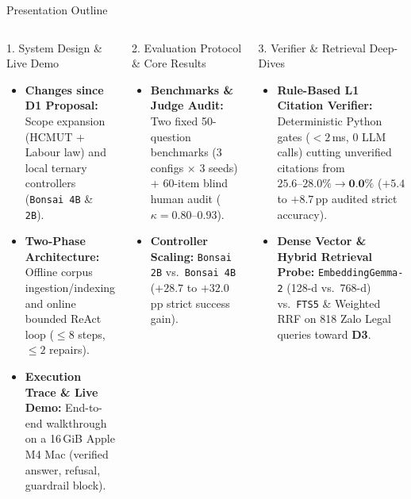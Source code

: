 \documentclass[aspectratio=1610,11pt]{beamer}
\newcommand{\pp}{\,pp\xspace}
\begin{document}
\begin{frame}{Presentation Outline}
  \begin{columns}[T]
    \begin{block}{1. System Design \& Live Demo}
      \scriptsize
      \begin{itemize}\scriptsize
        \item \textbf{Changes since D1 Proposal:} Scope expansion (HCMUT + Labour law) and local ternary controllers (\texttt{Bonsai 4B} \& \texttt{2B}).
        \item \textbf{Two-Phase Architecture:} Offline corpus ingestion/indexing and online bounded ReAct loop ($\le 8$ steps, $\le 2$ repairs).
        \item \textbf{Execution Trace \& Live Demo:} End-to-end walkthrough on a 16\,GiB Apple M4 Mac (verified answer, refusal, guardrail block).
      \end{itemize}
    \end{block}
    \vspace{2pt}

    \begin{block}{2. Evaluation Protocol \& Core Results}
      \scriptsize
      \begin{itemize}\scriptsize
        \item \textbf{Benchmarks \& Judge Audit:} Two fixed 50-question benchmarks (3 configs $\times$ 3 seeds) + 60-item blind human audit ($\kappa = 0.80\text{--}0.93$).
        \item \textbf{Controller Scaling:} \texttt{Bonsai 2B} vs.\ \texttt{Bonsai 4B} ($+28.7$ to $+32.0$\pp strict success gain).
      \end{itemize}
    \end{block}

    \begin{block}{3. Verifier \& Retrieval Deep-Dives}
      \scriptsize
      \begin{itemize}\scriptsize
        \item \textbf{Rule-Based L1 Citation Verifier:} Deterministic Python gates ($<2$\,ms, 0 LLM calls) cutting unverified citations from $25.6\text{--}28.0\% \to \textbf{0.0\%}$ ($+5.4$ to $+8.7$\pp audited strict accuracy).
        \item \textbf{Dense Vector \& Hybrid Retrieval Probe:} \texttt{EmbeddingGemma-2} (128-d vs.\ 768-d) vs.\ \texttt{FTS5} \& Weighted RRF on 818 Zalo Legal queries toward \textbf{D3}.
      \end{itemize}
    \end{block}
    \vspace{2pt}


\end{columns}
\end{frame}
\end{document}

